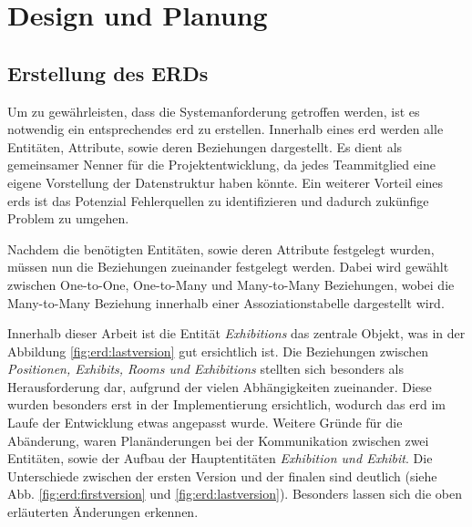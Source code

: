 \section{Design und Planung}

\subsection{Erstellung des ERDs}
Um zu gewährleisten, dass die Systemanforderung getroffen werden, ist es notwendig ein entsprechendes \gls{erd} zu erstellen.
Innerhalb eines \gls{erd} werden alle Entitäten, Attribute, sowie deren Beziehungen dargestellt.
Es dient als gemeinsamer Nenner für die Projektentwicklung, da jedes Teammitglied eine eigene Vorstellung der Datenstruktur haben könnte. 
Ein weiterer Vorteil eines \gls{erd}s ist das Potenzial Fehlerquellen zu identifizieren und dadurch zukünfige Problem zu umgehen. 

Nachdem die benötigten Entitäten, sowie deren Attribute festgelegt wurden, müssen nun die Beziehungen zueinander festgelegt werden. 
Dabei wird gewählt zwischen One-to-One, One-to-Many und Many-to-Many Beziehungen, wobei die Many-to-Many Beziehung innerhalb einer Assoziationstabelle dargestellt wird. 

Innerhalb dieser Arbeit ist die Entität \emph{Exhibitions} das zentrale Objekt, was in der Abbildung \ref{fig:erd:lastversion} gut ersichtlich ist.
Die Beziehungen zwischen \emph{Positionen, Exhibits, Rooms und Exhibitions} stellten sich besonders als Herausforderung dar, aufgrund der vielen Abhängigkeiten zueinander. 
Diese wurden besonders erst in der Implementierung ersichtlich, wodurch das \gls{erd} im Laufe der Entwicklung etwas angepasst wurde. 
Weitere Gründe für die Abänderung, waren Planänderungen bei der Kommunikation zwischen zwei Entitäten, sowie der Aufbau der Hauptentitäten \emph{Exhibition und Exhibit}. 
Die Unterschiede zwischen der ersten Version und der finalen sind deutlich (siehe Abb. \ref{fig:erd:firstversion} und \ref{fig:erd:lastversion}).
Besonders lassen sich die oben erläuterten Änderungen erkennen. 
 

